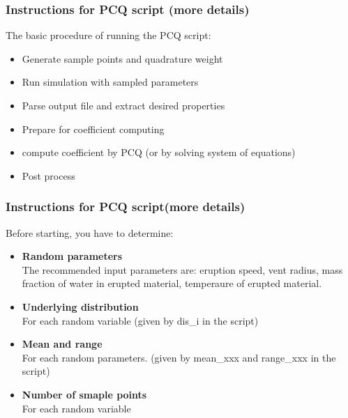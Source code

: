 \documentclass[10pt]{beamer}
\begin{document}
\begin{frame}
\frametitle{Instructions for PCQ script (more details)}
The basic procedure of running the PCQ script:
 \begin{itemize}
 \item Generate sample points and quadrature weight
 \item Run simulation with sampled parameters
 \item Parse output file and extract desired properties
 \item Prepare for coefficient computing
 \item compute coefficient by PCQ (or by solving system of equations)
 \item Post process
 \end{itemize}
\end{frame}
\begin{frame}
\frametitle{Instructions for PCQ script(more details)}
Before starting, you have to determine:
 \begin{itemize}
 \item {\bf Random parameters}\\
 The recommended input parameters are: eruption speed, vent radius, mass fraction of water in erupted material, temperaure of erupted material.
 \item {\bf Underlying distribution} \\
  For each random variable (given by dis\_i in the script)
 \item {\bf Mean and range} \\
  For each random parameters. (given by mean\_xxx and range\_xxx in the script)
 \item {\bf Number of smaple points} \\
 For each random variable
 \end{itemize}
\end{frame}
\end{document}
